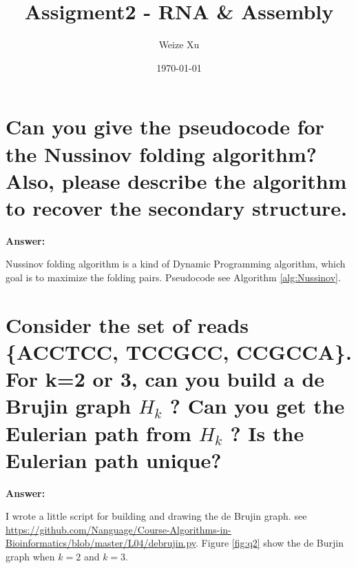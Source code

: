 \documentclass{article}
\title{Assigment2 - RNA \& Assembly}
\date{\today}
\author{Weize Xu}
\begin{document}
\maketitle

\section{Can you give the pseudocode for the Nussinov folding algorithm? Also, please
         describe the algorithm to recover the secondary structure.}

\large{\textbf{Answer:}}

Nussinov folding algorithm is a kind of Dynamic Programming algorithm, 
which goal is to maximize the folding pairs. Pseudocode see Algorithm \ref{alg:Nussinov}. \\


\section{Consider the set of reads \{ACCTCC, TCCGCC, CCGCCA\}. For k=2 or 3,
         can you build a de Brujin graph $H_k$ ? Can you get the Eulerian path from $H_k$ ? Is
         the Eulerian path unique?}

\large{\textbf{Answer:}}

I wrote a little script for building and drawing the de Brujin graph. 
see \url{https://github.com/Nanguage/Course-Algorithms-in-Bioinformatics/blob/master/L04/debrujin.py}.
Figure \ref{fig:q2} show the de Burjin graph when $k=2$ and $k=3$.
\end{document}
